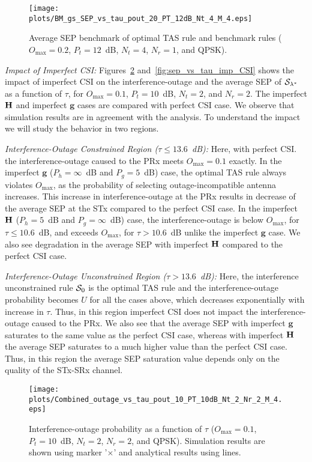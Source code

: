 \documentclass[12pt,draftcls,peerreview,onecolumn]{IEEEtran}
\newcommand{\mtx}[1]{{\bf #1}} %
\newcommand{\lam}{\lambda}
\newcommand{\Nt}{{N_t}}
\newcommand{\Nr}{{N_r}}
\newcommand{\Pt}{{P_t}}
\newcommand{\puch}{g}
\newcommand{\g}{\mathbf{\puch}}
\newcommand{\outmax}{O_{\text{max}}}
\newcommand{\itau}{\tau}
\newcommand{\un}{U}
\newcommand{\Hmx}{\mtx{H}}
\newcommand{\caluncons}{{\cal S_{\text{0}}}}
\newcommand{\callamstarrule}{\cal S_{\lam^{*}}}
\newcommand{\gpilotpower}{P_g}
\newcommand{\hpilotpower}{P_h}
\begin{document}
\begin{figure}
	\centering \texttt{[image: plots/BM\_gs\_SEP\_vs\_tau\_pout\_20\_PT\_12dB\_Nt\_4\_M\_4.eps]}
	\caption{Average SEP benchmark of optimal TAS rule and benchmark rules ($\outmax = 0.2$, $\Pt = 12$~dB, $\Nt = 4$, $\Nr=1$, and QPSK).}
	\label{fig:BM_SEP_vs_tau}
\end{figure}


{\em Impact of Imperfect CSI:} Figures~\ref{fig:out_vs_tau_imp_CSI} and~\ref{fig:sep_vs_tau_imp_CSI} shows the impact of imperfect CSI on the interference-outage and the average SEP of $\callamstarrule$ as a function of $\tau$, for $\outmax=0.1$, $\Pt = 10$~dB, $\Nt = 2$, and $\Nr = 2$. The imperfect $\Hmx$ and imperfect $\g$ cases are compared with perfect CSI case. We observe that simulation results are in agreement with the analysis. To understand the impact we will study the behavior in two regions. 

{\em Interference-Outage Constrained Region ($\itau\leq13.6$~dB):} Here, with perfect CSI. the interference-outage caused to the PRx meets $\outmax=0.1$ exactly. In the imperfect $\g$ ($\hpilotpower=\infty$~dB and $\gpilotpower=5$~dB) case, the optimal TAS rule always violates  $\outmax$, as the probability of selecting outage-incompatible antenna increases. This increase in interference-outage at the PRx results in decrease of the average SEP at the STx compared to the perfect CSI case. In the imperfect $\Hmx$ ($\hpilotpower=5$~dB and $\gpilotpower=\infty$~dB) case, the interference-outage is below $\outmax$, for $\itau\leq10.6$~dB, and exceeds $\outmax$, for $\itau>10.6$~dB unlike the imperfect $\g$ case. We also see degradation in the average SEP with imperfect $\Hmx$ compared to the perfect CSI case.    

{\em Interference-Outage Unconstrained Region ($\itau>13.6$~dB):} Here, the interference unconstrained rule $\caluncons$ is the optimal TAS rule and the interference-outage probability becomes $\un$ for all the cases above, which decreases exponentially with increase in $\itau$. Thus, in this region imperfect CSI does not impact the interference-outage caused to the PRx. We also see that the average SEP with imperfect $\g$ saturates to the same value as the perfect CSI case, whereas with imperfect $\Hmx$ the average SEP saturates to a much higher value than the perfect CSI case. Thus, in this region the average SEP saturation value depends only on the quality of the STx-SRx channel.  

\begin{figure}
	\centering \texttt{[image: plots/Combined\_outage\_vs\_tau\_pout\_10\_PT\_10dB\_Nt\_2\_Nr\_2\_M\_4.eps]}
	\caption{Interference-outage probability as a function of $\itau$ ($\outmax=0.1$, $\Pt = 10$~dB, $\Nt = 2$, $\Nr = 2$, and QPSK). Simulation results are shown using marker '$\times$' and analytical results using lines.}
	\label{fig:out_vs_tau_imp_CSI}
\end{figure}
\end{document}
